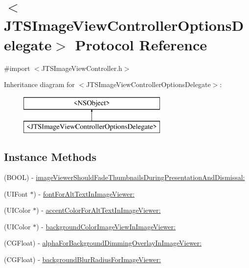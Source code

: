 \hypertarget{protocol_j_t_s_image_view_controller_options_delegate-p}{}\section{$<$J\+T\+S\+Image\+View\+Controller\+Options\+Delegate$>$ Protocol Reference}
\label{protocol_j_t_s_image_view_controller_options_delegate-p}


{\ttfamily \#import $<$J\+T\+S\+Image\+View\+Controller.\+h$>$}

Inheritance diagram for $<$J\+T\+S\+Image\+View\+Controller\+Options\+Delegate$>$\+:\begin{figure}[H]
\begin{center}
\leavevmode
\includegraphics[height=2.000000cm]{protocol_j_t_s_image_view_controller_options_delegate-p}
\end{center}
\end{figure}
\subsection*{Instance Methods}
\begin{DoxyCompactItemize}
\item 
(B\+O\+O\+L) -\/ \hyperlink{protocol_j_t_s_image_view_controller_options_delegate-p_a3b1587114fd108563e054c6c1f2bd360}{image\+Viewer\+Should\+Fade\+Thumbnails\+During\+Presentation\+And\+Dismissal\+:}
\item 
(U\+I\+Font $\ast$) -\/ \hyperlink{protocol_j_t_s_image_view_controller_options_delegate-p_a31fa95c2a99452c3d3d09cfcc6d87b26}{font\+For\+Alt\+Text\+In\+Image\+Viewer\+:}
\item 
(U\+I\+Color $\ast$) -\/ \hyperlink{protocol_j_t_s_image_view_controller_options_delegate-p_a69555bc3496d77da6116c5b5fb9c5624}{accent\+Color\+For\+Alt\+Text\+In\+Image\+Viewer\+:}
\item 
(U\+I\+Color $\ast$) -\/ \hyperlink{protocol_j_t_s_image_view_controller_options_delegate-p_ac709745b90b404a93eb300325a40a47f}{background\+Color\+Image\+View\+In\+Image\+Viewer\+:}
\item 
(C\+G\+Float) -\/ \hyperlink{protocol_j_t_s_image_view_controller_options_delegate-p_a37bb9fe1918b81fd71fa70445428a523}{alpha\+For\+Background\+Dimming\+Overlay\+In\+Image\+Viewer\+:}
\item 
(C\+G\+Float) -\/ \hyperlink{protocol_j_t_s_image_view_controller_options_delegate-p_ab20b68d5566bd2251e88ee2a2bfa4c66}{background\+Blur\+Radius\+For\+Image\+Viewer\+:}
\end{DoxyCompactItemize}


